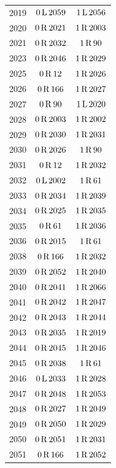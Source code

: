 \begin{longtable}{@{}rcc@{}}
2019 & $0\,\mathrm{L}\,2059$ & $1\,\mathrm{L}\,2056$\\
2020 & $0\,\mathrm{R}\,2021$ & $1\,\mathrm{R}\,2003$\\
2021 & $0\,\mathrm{R}\,2032$ & $1\,\mathrm{R}\,90$\\
2023 & $0\,\mathrm{R}\,2046$ & $1\,\mathrm{R}\,2029$\\
2025 & $0\,\mathrm{R}\,12$ & $1\,\mathrm{R}\,2026$\\
2026 & $0\,\mathrm{R}\,166$ & $1\,\mathrm{R}\,2027$\\
2027 & $0\,\mathrm{R}\,90$ & $1\,\mathrm{L}\,2020$\\
2028 & $0\,\mathrm{R}\,2003$ & $1\,\mathrm{R}\,2002$\\
2029 & $0\,\mathrm{R}\,2030$ & $1\,\mathrm{R}\,2031$\\
2030 & $0\,\mathrm{R}\,2026$ & $1\,\mathrm{R}\,90$\\
2031 & $0\,\mathrm{R}\,12$ & $1\,\mathrm{R}\,2032$\\
2032 & $0\,\mathrm{L}\,2002$ & $1\,\mathrm{R}\,61$\\
2033 & $0\,\mathrm{R}\,2034$ & $1\,\mathrm{R}\,2039$\\
2034 & $0\,\mathrm{R}\,2025$ & $1\,\mathrm{R}\,2035$\\
2035 & $0\,\mathrm{R}\,61$ & $1\,\mathrm{R}\,2036$\\
2036 & $0\,\mathrm{R}\,2015$ & $1\,\mathrm{R}\,61$\\
2038 & $0\,\mathrm{R}\,166$ & $1\,\mathrm{R}\,2032$\\
2039 & $0\,\mathrm{R}\,2052$ & $1\,\mathrm{R}\,2040$\\
2040 & $0\,\mathrm{R}\,2041$ & $1\,\mathrm{R}\,2066$\\
2041 & $0\,\mathrm{R}\,2042$ & $1\,\mathrm{R}\,2047$\\
2042 & $0\,\mathrm{R}\,2043$ & $1\,\mathrm{R}\,2044$\\
2043 & $0\,\mathrm{R}\,2035$ & $1\,\mathrm{R}\,2019$\\
2044 & $0\,\mathrm{R}\,2045$ & $1\,\mathrm{R}\,2046$\\
2045 & $0\,\mathrm{R}\,2038$ & $1\,\mathrm{R}\,61$\\
2046 & $0\,\mathrm{L}\,2033$ & $1\,\mathrm{R}\,2028$\\
2047 & $0\,\mathrm{R}\,2048$ & $1\,\mathrm{R}\,2053$\\
2048 & $0\,\mathrm{R}\,2027$ & $1\,\mathrm{R}\,2049$\\
2049 & $0\,\mathrm{R}\,2050$ & $1\,\mathrm{R}\,2029$\\
2050 & $0\,\mathrm{R}\,2051$ & $1\,\mathrm{R}\,2031$\\
2051 & $0\,\mathrm{R}\,166$ & $1\,\mathrm{R}\,2052$\\

\end{longtable}
